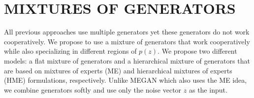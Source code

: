 \documentclass[a4paper,onesided,12pt]{report}
\begin{document}
%
\chapter{MIXTURES OF GENERATORS}
\label{chapter:mixture_gan}
All previous approaches use multiple generators yet these generators do not work cooperatively. We propose to use a mixture of generators that work cooperatively while also specializing in different regions of $p(z)$. We propose two different models: a flat mixture of generators and a hierarchical mixture of generators that are based on mixtures of experts (ME) \cite{jacobs1991adaptive} and hierarchical mixtures of experts (HME) \cite{jordan1994hierarchical} formulations, respectively. Unlike MEGAN which also uses the ME idea, we combine generators softly and use only the noise vector $z$ as the input.
\end{document}
